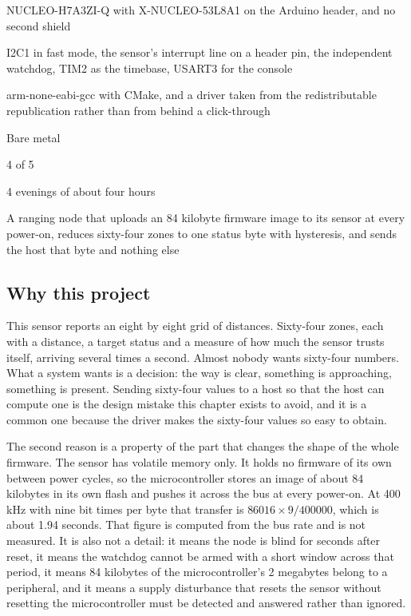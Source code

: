 
\begin{keyfacts}
\item[Board] NUCLEO-H7A3ZI-Q with X-NUCLEO-53L8A1 on the Arduino header, and no second shield
\item[Peripherals] I2C1 in fast mode, the sensor's interrupt line on a header pin, the independent watchdog, TIM2 as the timebase, USART3 for the console
\item[Toolchain] arm-none-eabi-gcc with CMake, and a driver taken from the redistributable republication rather than from behind a click-through
\item[Operating system] Bare metal
\item[Difficulty] 4 of 5
\item[Effort] 4 evenings of about four hours
\item[Deliverable] A ranging node that uploads an 84 kilobyte firmware image to its sensor at every power-on, reduces sixty-four zones to one status byte with hysteresis, and sends the host that byte and nothing else
\end{keyfacts}

\subsection*{Why this project}

This sensor reports an eight by eight grid of distances. Sixty-four zones, each
with a distance, a target status and a measure of how much the sensor trusts
itself, arriving several times a second. Almost nobody wants sixty-four numbers.
What a system wants is a decision: the way is clear, something is approaching,
something is present. Sending sixty-four values to a host so that the host can
compute one is the design mistake this chapter exists to avoid, and it is a
common one because the driver makes the sixty-four values so easy to obtain.

The second reason is a property of the part that changes the shape of the whole
firmware. The sensor has volatile memory only. It holds no firmware of its own
between power cycles, so the microcontroller stores an image of about 84
kilobytes in its own flash and pushes it across the bus at every power-on. At
400 kHz with nine bit times per byte that transfer is
$86016 \times 9 / 400000$, which is about 1.94 seconds. That figure is computed
from the bus rate and is not measured. It is also not a detail: it means the
node is blind for seconds after reset, it means the watchdog cannot be armed
with a short window across that period, it means 84 kilobytes of the
microcontroller's 2 megabytes belong to a peripheral, and it means a supply
disturbance that resets the sensor without resetting the microcontroller must be
detected and answered rather than ignored.

